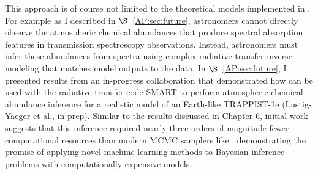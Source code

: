 This approach is of course not limited to the theoretical models implemented in \vplanet. For example as I described in $\S$~\ref{AP:sec:future}, astronomers cannot directly observe the atmospheric chemical abundances that produce spectral absorption features in transmission spectroscopy observations. Instead, astronomers must infer these abundances from spectra using complex radiative transfer inverse modeling that matches model outputs to the data. In $\S$~\ref{AP:sec:future}, I presented results from an in-progress collaboration that demonstrated how \approxposterior can be used with the radiative transfer code SMART \citep{Meadows1996,Crisp1997} to perform atmospheric chemical abundance inference for a realistic model of an Earth-like TRAPPIST-1e (Lustig-Yaeger et al., in prep). Similar to the results discussed in Chapter 6, initial work suggests that this inference required nearly three orders of magnitude fewer computational resources than modern MCMC samplers like \emcee, demonstrating the promise of applying novel machine learning methods to Bayesian inference problems with computationally-expensive models.


